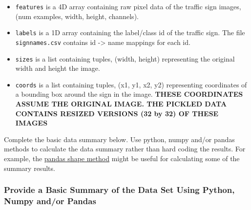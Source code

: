 \documentclass[11pt]{article}
\providecommand{\tightlist}{%
      \setlength{\itemsep}{0pt}\setlength{\parskip}{0pt}}
\begin{document}
\begin{itemize}
\tightlist
\item
  \texttt{\textquotesingle{}features\textquotesingle{}} is a 4D array
  containing raw pixel data of the traffic sign images, (num examples,
  width, height, channels).
\item
  \texttt{\textquotesingle{}labels\textquotesingle{}} is a 1D array
  containing the label/class id of the traffic sign. The file
  \texttt{signnames.csv} contains id -\textgreater{} name mappings for
  each id.
\item
  \texttt{\textquotesingle{}sizes\textquotesingle{}} is a list
  containing tuples, (width, height) representing the original width and
  height the image.
\item
  \texttt{\textquotesingle{}coords\textquotesingle{}} is a list
  containing tuples, (x1, y1, x2, y2) representing coordinates of a
  bounding box around the sign in the image. \textbf{THESE COORDINATES
  ASSUME THE ORIGINAL IMAGE. THE PICKLED DATA CONTAINS RESIZED VERSIONS
  (32 by 32) OF THESE IMAGES}
\end{itemize}

Complete the basic data summary below. Use python, numpy and/or pandas
methods to calculate the data summary rather than hard coding the
results. For example, the
\href{http://pandas.pydata.org/pandas-docs/stable/generated/pandas.DataFrame.shape.html}{pandas
shape method} might be useful for calculating some of the summary
results.

    \subsubsection{Provide a Basic Summary of the Data Set Using Python,
Numpy and/or
Pandas}\label{provide-a-basic-summary-of-the-data-set-using-python-numpy-andor-pandas}
\end{document}

